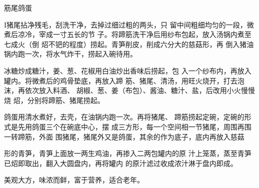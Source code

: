 \begin{recipe}[筋鞭鸽蛋]{筋尾鸽蛋}

\ingredients


\cooking

I猪尾拈净残毛，刮洗干净，去掉过细过粗的两头，只 留中间粗细均匀的一段，微煮后凉冷，宰成一寸五长的节 子。将蹄筋洗干净后用纱布包起，放入汤锅内煮至七成火（倒 炤不钯的程度）捞起。青笋削皮，削成六分大的慈菇形，再 倒入猪油锅内跑一次，将水气炸干，捞起入碗待用。

冰糖炒成糖汁，姜、葱、花椒用白油炒出香味后捞起，包 入一个纱布内，再放入罐内。将微煮后的鸡骨垫底，再放入蹄 筋、猪尾、清汤，用旺火烧开，打去泡沫，再依次放入料酒、 胡椒、葱、姜（布包）、酱油、糖汁、盐，后改用小火慢慢烧 炤，分别将蹄筋、猪尾捞起。

鸽蛋用清水煮好，去壳，在油锅内跑一次。再将猪尾、 蹄筋捞起定碗，定碗的形式是先用鸽蛋三个在碗底中心，摆 成三方形，每一个空间相一节猪尾，周围再围一转蹄筋，外面 围猪尾，猪尾外又是鸽蛋，其余的作为底子，底内再放入慈菇

形的青笋，青笋上面放一两生鸡油，再掺入二两包罐内的原 汁上笼蒸，蒸至青笋已炤即取出，翻入大圆盘内，再将罐内 的原汁滤过收成浓汁淋于盘内即成。

\notes

美观大方，味浓而鲜，富于营养，适合老年。

\end{recipe}

